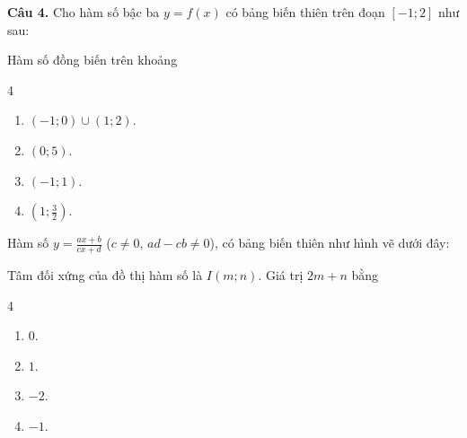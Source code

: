 \begin{baitap}
	\textbf{Câu 4.} Cho hàm số bậc ba $y = f(x)$ có bảng biến thiên trên đoạn $[-1; 2]$ như sau:
	

\begin{center}
\end{center}
	
	Hàm số đồng biến trên khoảng
	\begin{multicols}{4}
		\begin{enumerate}
			\item $(-1; 0) \cup (1; 2)$.
			\item $(0; 5)$.
			\item $(-1; 1)$.
			\item $\left(1; \frac{3}{2}\right)$.
		\end{enumerate}
	\end{multicols}
\end{baitap}
\begin{baitap}
	Hàm số $y = \frac{ax + b}{cx + d}$ ($c \ne 0$, $ad - cb \ne 0$), có bảng biến thiên như hình vẽ dưới đây:
	\begin{center}
	\end{center}
		Tâm đối xứng của đồ thị hàm số là $I(m; n)$. Giá trị $2m + n$ bằng
	\begin{multicols}{4}
		\begin{enumerate}
			\item $0$.
			\item $1$.
			\item $-2$.
			\item $-1$.
		\end{enumerate}
	\end{multicols}
\end{baitap}

